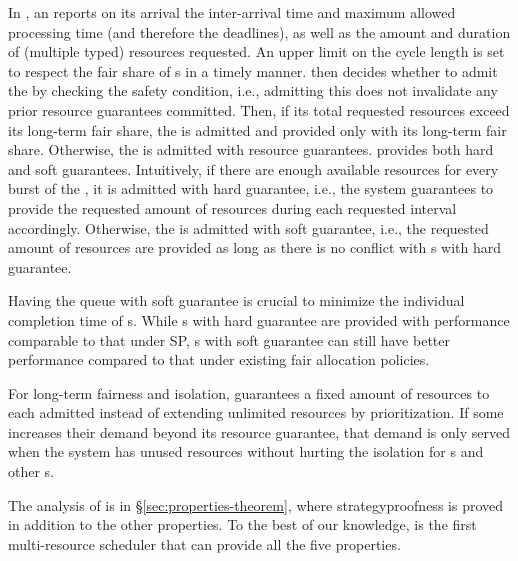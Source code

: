 In {\name}, an {\burstq} reports on its arrival the inter-arrival time and maximum allowed processing time (and therefore the deadlines), as well as the amount and duration of (multiple typed) resources requested. An upper limit on the cycle length is set to respect the fair share of {\batchq}s in a timely manner. 
{\name} then decides whether to admit the {\burstq} by checking the safety condition, i.e., admitting this {\burstq} does not invalidate any prior resource guarantees committed. Then, if its total requested resources exceed its long-term fair share, the {\burstq} is admitted and provided only with its long-term fair share. Otherwise, the {\burstq} is admitted with resource guarantees. \name provides both hard and soft guarantees.   
Intuitively, if there are enough available resources for every burst of the {\burstq}, it is admitted with hard guarantee, i.e., the system guarantees to provide the requested amount of resources during each requested interval accordingly. 
Otherwise, the {\burstq} is admitted with soft guarantee, i.e., the requested amount of resources are provided as long as there is no conflict with {\burstq}s with hard guarantee. 

Having the queue with soft guarantee is crucial to minimize the individual completion time of {\burstq}s. 
While {\burstq}s with hard guarantee are provided with performance comparable to that under SP, {\burstq}s with soft guarantee can still have better performance compared to that under existing fair allocation policies. 

For long-term fairness and isolation, {\name} guarantees a fixed amount of resources to each admitted {\burstq} instead of extending unlimited resources by prioritization. 
If some {\burstq} increases their demand beyond its resource guarantee, that demand is only served when the system has unused resources without hurting the isolation for {\batchq}s and other {\burstq}s. 

The analysis of \name is in \S\ref{sec:properties-theorem}, where strategyproofness is proved in addition to the other properties. To the best of our knowledge, \name is the first multi-resource scheduler that can provide all the five properties. 


